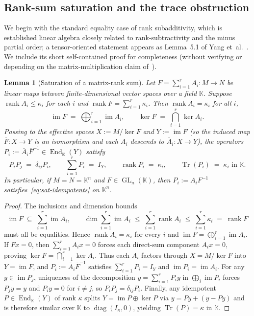 \documentclass[11pt,reqno]{amsart}
\newtheorem{lemma}[theorem]{Lemma}
\theoremstyle{definition}
\theoremstyle{remark}
\numberwithin{equation}{section}
\newcommand{\KK}{\mathbb{K}}
\DeclareMathOperator{\rk}{rank}
\DeclareMathOperator{\End}{End}
\DeclareMathOperator{\GL}{GL}
\DeclareMathOperator{\Tr}{Tr}
\DeclareMathOperator{\im}{im}
\DeclareMathOperator{\diag}{diag}
\begin{document}
\subsection{Rank-sum saturation and the trace obstruction}

We begin with the standard equality case of rank subadditivity, which is established linear algebra closely related to rank-subtractivity and the minus partial order; a tensor-oriented statement appears as Lemma~5.1 of Yang et~al.~\cite{Yang2026}. We include its short self-contained proof for completeness (without verifying or depending on the matrix-multiplication claim of~\cite{Yang2026}).

\begin{lemma}[Saturation of a matrix-rank sum]\label{lem:saturation}
Let $F = \sum_{i=1}^r A_i : M \to N$ be linear maps between finite-dimensional vector spaces over a field $\KK$. Suppose $\rk A_i \le \kappa_i$ for each $i$ and $\rk F = \sum_{i=1}^r \kappa_i$. Then $\rk A_i = \kappa_i$ for all $i$,
\[
  \im F \;=\; \bigoplus_{i=1}^r \im A_i, \qquad \ker F \;=\; \bigcap_{i=1}^r \ker A_i.
\]
Passing to the effective spaces $X := M/\ker F$ and $Y := \im F$ (so the induced map $\overline{F} : X \to Y$ is an isomorphism and each $A_i$ descends to $\overline{A}_i : X \to Y$), the operators $P_i := \overline{A}_i \overline{F}^{-1} \in \End_{\KK}(Y)$ satisfy
\begin{equation}\label{eq:sat-idempotents}
  P_i P_j \;=\; \delta_{ij} P_i, \qquad \sum_{i=1}^r P_i \;=\; I_Y, \qquad \rk P_i \;=\; \kappa_i, \qquad \Tr(P_i) \;=\; \kappa_i \text{ in } \KK.
\end{equation}
In particular, if $M = N = \KK^n$ and $F \in \GL_n(\KK)$, then $P_i := A_i F^{-1}$ satisfies~\eqref{eq:sat-idempotents} on $\KK^n$.
\end{lemma}

\begin{proof}
The inclusions and dimension bounds
\[
  \im F \;\subseteq\; \sum_{i=1}^r \im A_i, \qquad
  \dim\sum_{i=1}^r \im A_i \;\le\; \sum_{i=1}^r \rk A_i \;\le\; \sum_{i=1}^r \kappa_i \;=\; \rk F
\]
must all be equalities. Hence $\rk A_i = \kappa_i$ for every $i$ and $\im F = \bigoplus_{i=1}^r \im A_i$. If $F x = 0$, then $\sum_{i=1}^r A_i x = 0$ forces each direct-sum component $A_i x = 0$, proving $\ker F = \bigcap_{i=1}^r \ker A_i$. Thus each $A_i$ factors through $X = M/\ker F$ into $Y = \im F$, and $P_i := \overline{A}_i \overline{F}^{-1}$ satisfies $\sum_{i=1}^r P_i = I_Y$ and $\im P_i = \im A_i$. For any $y \in \im P_j$, uniqueness of the decomposition $y = \sum_{i=1}^r P_i y$ in $\bigoplus_i \im P_i$ forces $P_j y = y$ and $P_i y = 0$ for $i \neq j$, so $P_i P_j = \delta_{ij} P_i$. Finally, any idempotent $P \in \End_{\KK}(Y)$ of rank $\kappa$ splits $Y = \im P \oplus \ker P$ via $y = Py + (y - Py)$ and is therefore similar over $\KK$ to $\diag(I_\kappa, 0)$, yielding $\Tr(P) = \kappa$ in $\KK$.
\end{proof}
\end{document}

